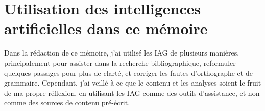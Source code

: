 \section{Utilisation des intelligences artificielles dans ce mémoire}

Dans la rédaction de ce mémoire, j'ai utilisé les IAG de plusieurs mani\`eres, principalement pour assister dans la recherche bibliographique, reformuler quelques passages pour plus de clart\'e, et corriger les fautes d'orthographe et de grammaire.
Cependant, j'ai veill\'e \`a ce que le contenu et les analyses soient le fruit de ma propre r\'eflexion, en utilisant les IAG comme des outils d'assistance, et non comme des sources de contenu pr\'e-\'ecrit.
